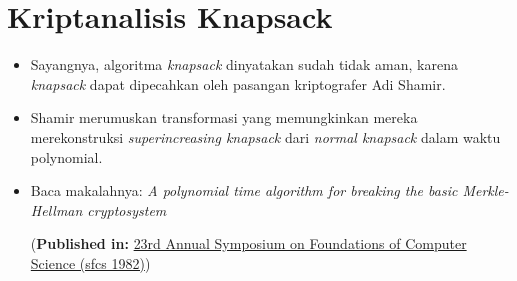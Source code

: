 \documentclass{article}
\begin{document}

\section*{Kriptanalisis Knapsack}

\begin{itemize}
    \item Sayangnya, algoritma \textit{knapsack} dinyatakan sudah tidak aman, karena \textit{knapsack} dapat dipecahkan oleh pasangan kriptografer Adi Shamir.
    \item Shamir merumuskan transformasi yang memungkinkan mereka merekonstruksi \textit{superincreasing knapsack} dari \textit{normal knapsack} dalam waktu polynomial.
    \item Baca makalahnya: \textit{A polynomial time algorithm for breaking the basic Merkle-Hellman cryptosystem}

    (\textbf{Published in:} \href{https://doi.org/10.1145/800014.800015}{23rd Annual Symposium on Foundations of Computer Science (sfcs 1982)})
\end{itemize}
\end{document}
